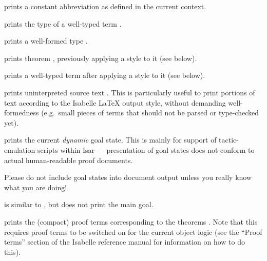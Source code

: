 \begin{isabellebody}
\begin{isamarkuptext}
\begin{descr}
  \item [\isa{{\isacharat}{\isacharbraceleft}abbrev\ c\ x\isactrlsub {\isadigit{1}}\ {\isasymdots}\ x\isactrlsub n{\isacharbraceright}}] prints a constant
  abbreviation  as defined in
  the current context.

  \item [\isa{{\isacharat}{\isacharbraceleft}typeof\ t{\isacharbraceright}}] prints the type of a well-typed term
  .

  \item [\isa{{\isacharat}{\isacharbraceleft}typ\ {\isasymtau}{\isacharbraceright}}] prints a well-formed type \isa{{\isasymtau}}.
  
  \item [\isa{{\isacharat}{\isacharbraceleft}thm{\isacharunderscore}style\ s\ a{\isacharbraceright}}] prints theorem ,
  previously applying a style  to it (see below).
  
  \item [\isa{{\isacharat}{\isacharbraceleft}term{\isacharunderscore}style\ s\ t{\isacharbraceright}}] prints a well-typed term  after applying a style  to it (see below).

  \item [\isa{{\isacharat}{\isacharbraceleft}text\ s{\isacharbraceright}}] prints uninterpreted source text .  This is particularly useful to print portions of text according
  to the Isabelle {\LaTeX} output style, without demanding
  well-formedness (e.g.\ small pieces of terms that should not be
  parsed or type-checked yet).

  \item [\isa{{\isacharat}{\isacharbraceleft}goals{\isacharbraceright}}] prints the current \emph{dynamic} goal
  state.  This is mainly for support of tactic-emulation scripts
  within Isar --- presentation of goal states does not conform to
  actual human-readable proof documents.

  Please do not include goal states into document output unless you
  really know what you are doing!
  
  \item [\isa{{\isacharat}{\isacharbraceleft}subgoals{\isacharbraceright}}] is similar to , but
  does not print the main goal.
  
  \item [\isa{{\isacharat}{\isacharbraceleft}prf\ a\isactrlsub {\isadigit{1}}\ {\isasymdots}\ a\isactrlsub n{\isacharbraceright}}] prints the (compact)
  proof terms corresponding to the theorems . Note that this requires proof terms to be switched on
  for the current object logic (see the ``Proof terms'' section of the
  Isabelle reference manual for information on how to do this).
  

\end{descr}
\end{isamarkuptext}
\end{isabellebody}
